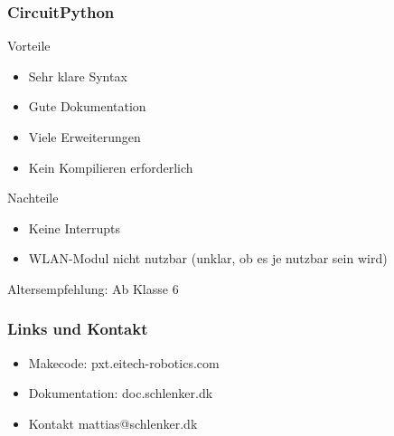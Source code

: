\documentclass{beamer}
\begin{document}
\begin{frame}
\frametitle{CircuitPython}

Vorteile

\begin{itemize}
\item Sehr klare Syntax
\item Gute Dokumentation
\item Viele Erweiterungen
\item Kein Kompilieren erforderlich
\end{itemize}

Nachteile 

\begin{itemize}
\item Keine Interrupts
\item WLAN-Modul nicht nutzbar (unklar, ob es je nutzbar sein wird)
\end{itemize}

Altersempfehlung: Ab Klasse 6 

\end{frame}

\begin{frame}
\frametitle{Links und Kontakt}

\begin{itemize}
\item Makecode: pxt.eitech-robotics.com
\item Dokumentation: doc.schlenker.dk
\item Kontakt mattias@schlenker.dk
\end{itemize}

\end{frame}
\end{document}
